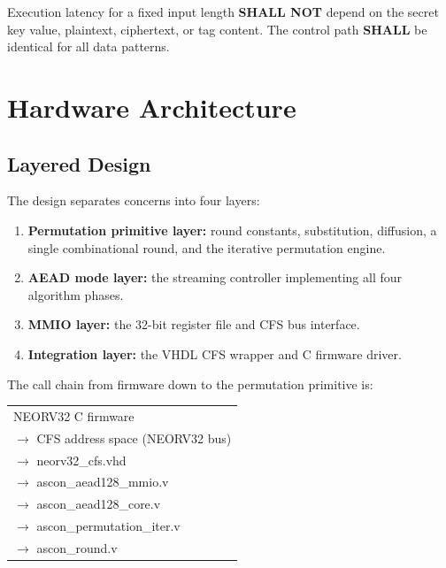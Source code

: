 \documentclass[11pt,a4paper]{article}
\newcommand{\nfr}[3]{%
  \begin{tcolorbox}[
    enhanced, colback=nfrbg, colframe=nfrframe,
    arc=2pt, boxrule=0.5pt,
    left=6pt, right=6pt, top=3pt, bottom=3pt,
    attach boxed title to top left={yshift=-2mm, xshift=8pt},
    boxed title style={colback=nfrframe, arc=2pt, boxrule=0pt,
                       left=4pt, right=4pt, top=2pt, bottom=2pt},
    title={\small\bfseries\color{white}#1\enspace\textbar\enspace\textit{#2}},
    before upper={\small}
  ]
  #3
  \end{tcolorbox}\vspace{3pt}}
\begin{document}
\nfr{NFR-007}{Timing determinism}{%
  Execution latency for a fixed input length \textbf{SHALL NOT} depend on
  the secret key value, plaintext, ciphertext, or tag content. The
  control path \textbf{SHALL} be identical for all data patterns.}

\section{Hardware Architecture}
\label{sec:architecture}

\subsection{Layered Design}

The design separates concerns into four layers:

\begin{enumerate}
  \item \textbf{Permutation primitive layer:}
        round constants, substitution, diffusion, a single combinational round,
        and the iterative permutation engine.
  \item \textbf{AEAD mode layer:}
        the streaming controller implementing all four algorithm phases.
  \item \textbf{MMIO layer:}
        the 32-bit register file and CFS bus interface.
  \item \textbf{Integration layer:}
        the VHDL CFS wrapper and C firmware driver.
\end{enumerate}

The call chain from firmware down to the permutation primitive is:

\begin{center}
\ttfamily\small
\begin{tabular}{@{}l@{}}
  NEORV32 C firmware \\
  \quad $\rightarrow$ CFS address space (NEORV32 bus) \\
  \quad\quad $\rightarrow$ neorv32\_cfs.vhd \\
  \quad\quad\quad $\rightarrow$ ascon\_aead128\_mmio.v \\
  \quad\quad\quad\quad $\rightarrow$ ascon\_aead128\_core.v \\
  \quad\quad\quad\quad\quad $\rightarrow$ ascon\_permutation\_iter.v \\
  \quad\quad\quad\quad\quad\quad $\rightarrow$ ascon\_round.v \\
\end{tabular}
\end{center}
\end{document}
